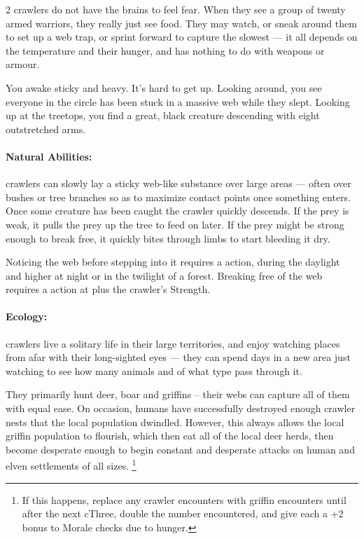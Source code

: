 \begin{multicols}{2}
\Glspl{crawler} do not have the brains to feel fear.
When they see a group of twenty armed warriors, they really just see food.
They may watch, or sneak around them to set up a web trap, or sprint forward to capture the slowest --- it all depends on the temperature and their hunger, and has nothing to do with weapons or armour.

\chitincrawler

\begin{boxtext}
  You awake sticky and heavy.
  It's hard to get up.
  Looking around, you see everyone in the circle has been stuck in a massive web while they slept.
  Looking up at the treetops, you find a great, black creature descending with eight outstretched arms.
\end{boxtext}

\paragraph{Natural Abilities:} \Glspl{crawler} can slowly lay a sticky web-like substance over large areas --- often over bushes or tree branches so as to maximize contact points once something enters.
Once some creature has been caught the \gls{crawler} quickly descends.
If the prey is weak, it pulls the prey up the tree to feed on later.
If the prey might be strong enough to break free, it quickly bites through limbs to start bleeding it dry.

Noticing the web before stepping into it requires a  action, \tn[7] during the daylight and higher at night or in the twilight of a forest.
Breaking free of the web requires a  action at \tn[8] plus the \gls{crawler}'s Strength.

\paragraph{Ecology:}
\glspl{crawler} live a solitary life in their large territories, and enjoy watching places from afar with their long-sighted eyes --- they can spend days in a new area just watching to see how many animals and of what type pass through it.

They primarily hunt deer, boar and \glspl{griffin} -- their webs can capture all of them with equal ease.
On occasion, humans have successfully destroyed enough \gls{crawler} nests that the local population dwindled.
However, this always allows the local \gls{griffin} population to flourish, which then eat all of the local deer herds, then become desperate enough to begin constant and desperate attacks on human and elven settlements of all sizes.%
\footnote{If this happens, replace any \gls{crawler} encounters with \gls{griffin} encounters until after the next \gls{cThree}, double the number encountered, and give each a +2 bonus to Morale checks due to hunger.}
\label{crawlerBalance}


\end{multicols}
